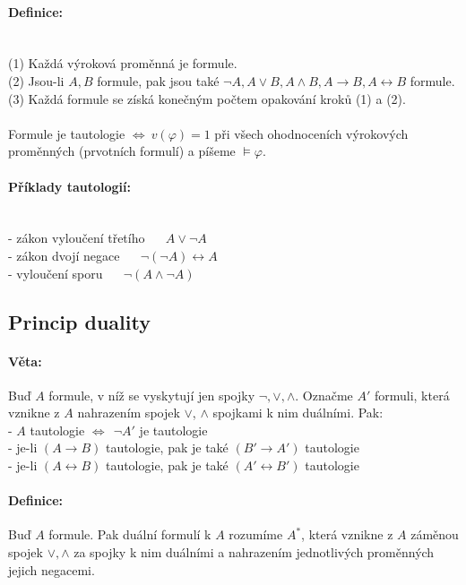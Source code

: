 \paragraph*{Definice:} ~\\
(1) Každá výroková proměnná je formule.\\
(2) Jsou-li $A, B$ formule, pak jsou také $ \neg A, A \vee B, A \wedge B, A \rightarrow B, A \leftrightarrow B $ formule.\\
(3) Každá formule se získá konečným počtem opakování kroků (1) a (2).\\
~\\
Formule je tautologie $\Leftrightarrow ~ v(\varphi ) = 1$ při všech ohodnoceních výrokových proměnných (prvotních formulí) a píšeme $\models \varphi $.
%
\paragraph*{Příklady tautologií:}~\\
- zákon vyloučení třetího ~~ $ A \vee \neg A $\\
- zákon dvojí negace ~~ $ \neg ( \neg A) \leftrightarrow A$\\
- vyloučení sporu ~~ $ \neg ( A \wedge \neg A ) $
\subsection*{Princip duality}
\paragraph*{Věta:}
Buď $A$ formule, v níž se vyskytují jen spojky $\neg , \vee , \wedge $.
Označme $ A ' $ formuli, která vznikne z $A$ nahrazením spojek $ \vee $, $ \wedge $
spojkami k nim duálními. Pak:\\
- $A$ tautologie $ \Leftrightarrow ~~ \neg A ' $ je tautologie\\
- je-li $(A \rightarrow B)$ tautologie, pak je také $(B' \rightarrow A')$ tautologie\\
- je-li $(A \leftrightarrow B)$ tautologie, pak je také $(A' \leftrightarrow B')$ tautologie

\paragraph*{Definice:}
Buď $A$ formule. Pak duální formulí k $A$ rozumíme $A^*$, která vznikne z $A$ záměnou spojek $ \vee , \wedge $ za spojky k nim duálními a nahrazením jednotlivých proměnných jejich negacemi.

